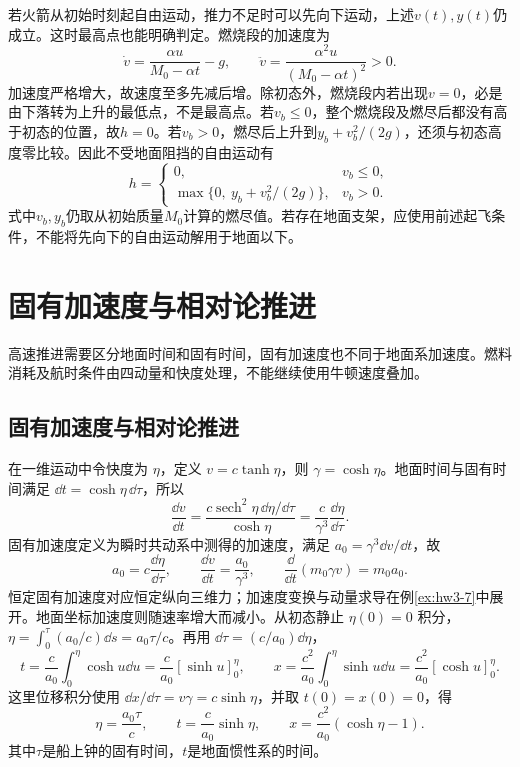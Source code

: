 \begin{solution}
若火箭从初始时刻起自由运动，推力不足时可以先向下运动，上述$v(t),y(t)$仍成立。这时最高点也能明确判定。燃烧段的加速度为
\[
\dot v=\frac{\alpha u}{M_0-\alpha t}-g,\qquad
\ddot v=\frac{\alpha^2u}{(M_0-\alpha t)^2}>0.
\]
加速度严格增大，故速度至多先减后增。除初态外，燃烧段内若出现$v=0$，必是由下落转为上升的最低点，不是最高点。若$v_b\le0$，整个燃烧段及燃尽后都没有高于初态的位置，故$h=0$。若$v_b>0$，燃尽后上升到$y_b+v_b^2/(2g)$，还须与初态高度零比较。因此不受地面阻挡的自由运动有
\[
\boxed{h=\begin{cases}
0,&v_b\le0,\\
\max\{0,\ y_b+v_b^2/(2g)\},&v_b>0.
\end{cases}}
\]
式中$v_b,y_b$仍取从初始质量$M_0$计算的燃尽值。若存在地面支架，应使用前述起飞条件，不能将先向下的自由运动解用于地面以下。


\end{solution}



\section{固有加速度与相对论推进}

高速推进需要区分地面时间和固有时间，固有加速度也不同于地面系加速度。燃料消耗及航时条件由四动量和快度处理，不能继续使用牛顿速度叠加。



\subsection{固有加速度与相对论推进}
\label{sec:complete3-relativity}
在一维运动中令快度为 $\eta$，定义 $v=c\tanh\eta$，则 $\gamma=\cosh\eta$。地面时间与固有时间满足 $\dd t=\cosh\eta\,\dd\tau$，所以
\[
\frac{\dd v}{\dd t}
=\frac{c\operatorname{sech}^2\eta\,\dd\eta/\dd\tau}{\cosh\eta}
=\frac c{\gamma^3}\frac{\dd\eta}{\dd\tau}.
\]
固有加速度定义为瞬时共动系中测得的加速度，满足 $a_0=\gamma^3\dd v/\dd t$，故
\[
 a_0=c\frac{\dd\eta}{\dd\tau},\qquad
 \frac{\dd v}{\dd t}=\frac{a_0}{\gamma^3},\qquad
 \frac{\dd}{\dd t}(m_0\gamma v)=m_0a_0.
\]
恒定固有加速度对应恒定纵向三维力；加速度变换与动量求导在例\ref{ex:hw3-7}中展开。地面坐标加速度则随速率增大而减小。从初态静止 $\eta(0)=0$ 积分，$\eta=\int_0^\tau(a_0/c)\dd s=a_0\tau/c$。再用 $\dd\tau=(c/a_0)\dd\eta$，
\[
t=\frac c{a_0}\int_0^\eta\cosh u\dd u
=\frac c{a_0}[\sinh u]_0^\eta,
\qquad
x=\frac{c^2}{a_0}\int_0^\eta\sinh u\dd u
=\frac{c^2}{a_0}[\cosh u]_0^\eta.
\]
这里位移积分使用 $\dd x/\dd\tau=v\gamma=c\sinh\eta$，并取 $t(0)=x(0)=0$，得
\[
 \eta=\frac{a_0\tau}{c},\qquad
 t=\frac c{a_0}\sinh\eta,\qquad
 x=\frac{c^2}{a_0}(\cosh\eta-1).
\]
其中$\tau$是船上钟的固有时间，$t$是地面惯性系的时间。

